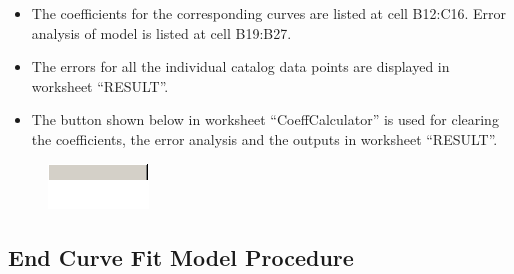 \begin{itemize}
\item
  The coefficients for the corresponding curves are listed at cell B12:C16. Error analysis of model is listed at cell B19:B27.
\item
  The errors for all the individual catalog data points are displayed in worksheet ``RESULT''.
\item
  The button shown below in worksheet ``CoeffCalculator'' is used for clearing the coefficients, the error analysis and the outputs in worksheet ``RESULT''.
\end{itemize}

\begin{figure}[htbp]
\centering
\includegraphics{media/image045.png}
\caption{}
\end{figure}

\subsection{End Curve Fit Model Procedure}\label{end-curve-fit-model-procedure-001}
